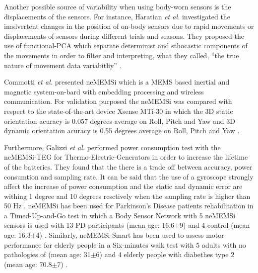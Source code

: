 \documentclass[10pt,journal,onecolumn,compsoc]{IEEEtran}
\begin{document}
Another possible source of variability when using body-worn sensors is the displacements of the 
sensors. For instance, 
Haratian \textit{et al.} investigated the inadvertent changes in the position of on-body sensors 
due to rapid movements or displacements of sensors during different trials and seasons.
They proposed the use of functional-PCA 
which separate determinist and sthocastic components of the movements
in order to filter and interpreting, what they called, ``the true nature of movement data variabitliy'' 
\cite{Haratian2012,Haratian2014,Haratian2016}.

Commotti \textit{et al.} presented neMEMSi which is a MEMS based inertial and magnetic 
system-on-bard with embedding processing and wireless communication.
For validation purposed the neMEMSi was compared with respect to the state-of-the-art device Xsense MTi-30
in which the 3D static orientation acuracy is 0.057 degrees average on Roll, Pitch and Yaw 
and 3D dynamic orientation acuracy is 0.55 degrees average on Roll, Pitch and Yaw \cite{Comotti2014}.


Furthermore, Galizzi \textit{et al.} performed power consumption test with the 
neMEMSi-TEG for Thermo-Electric-Generators in order to increase the lifetime of the batteries.
They found that the there is a trade off between accuracy, power consumtion and sampling rate.
It can be said that the use of a gyroscope strongly affect the increase of power consumption
and the static and dynamic error are withing 1 degree and 10 degrees resctively 
when the sampling rate is higher than 50 Hz \cite{Galizzi2015}.
neMEMSi has been used for Parkinson's Disease patients rehabilitation 
in a Timed-Up-and-Go test in which a Body Sensor Network with 5 neMEMSi sensors is used 
with 13 PD participants (mean age: 16.6$\pm$9) and 4 control (mean age: 16.3$\pm$4)
\cite{Caldara2014}.
Similarly, neMEMSi-Smart has been used to assess motor performance for elderly people
in a Six-minutes walk test with 5 adults with no pathologies of (mean age: 31$\pm$6)
and  4 elderly people with diabethes type 2  (mean age: 70.8$\pm$7) \cite{Caldara2015}.
\end{document}
